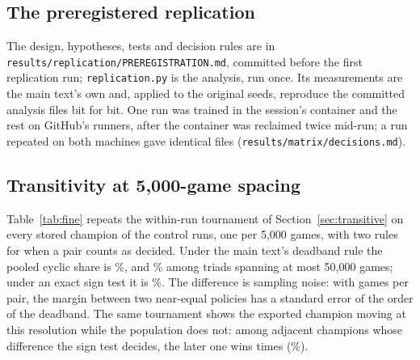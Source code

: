 \documentclass[11pt]{article}
\begin{document}
\begin{table}[!htbp]
\centering\small
\caption{Cross-run tournament of final champions, by condition.}
\label{tab:crossrun}

\end{table}

\FloatBarrier
\subsection{The preregistered replication}
\label{app:replication}

The design, hypotheses, tests and decision rules are in
\texttt{results/replication/PREREGISTRATION.md}, committed before the first
replication run; \texttt{replication.py} is the analysis, run once. Its
measurements are the main text's own and, applied to the original seeds,
reproduce the committed analysis files bit for bit. One run was trained in
the session's container and the rest on GitHub's runners, after the container
was reclaimed twice mid-run; a run repeated on both machines gave identical
files (\texttt{results/matrix/decisions.md}).

\begin{table}[!htbp]
\centering\small
\caption{The preregistered replication: \nRepRuns{} fresh runs per condition,
every criterion fixed before the first run. Tests in the Holm family hold when
rejected at family-wise $\alpha=0.05$.}
\label{tab:replication}
\resizebox{\linewidth}{!}{}
\end{table}

\FloatBarrier
\subsection{Transitivity at 5,000-game spacing}
\label{app:fine}

Table~\ref{tab:fine} repeats the within-run tournament of
Section~\ref{sec:transitive} on every stored champion of the control runs,
one per 5,000 games, with two rules for when a pair counts as decided. Under
the main text's deadband rule the pooled cyclic share is
\nFineCyclicDeadbandPct\%, and \nFineShortDeadbandPct\% among triads spanning at
most 50,000 games; under an exact sign test it is \nFineCyclicSignPct\%. The
difference is sampling noise: with \nFineGames{} games per pair, the margin
between two near-equal policies has a standard error of the order of the
deadband. The same tournament shows the exported champion moving at this
resolution while the population does not: among adjacent champions whose
difference the sign test decides, the later one wins \nFineNextWins{} times
(\nFineNextWinsPct\%).
\end{document}

